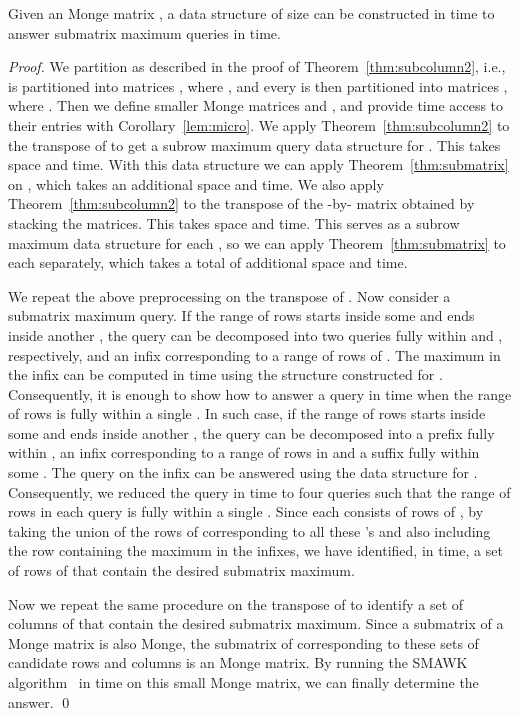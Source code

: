 \documentclass{llncs}
\begin{document}
\begin{theorem}
\label{thm:submatrix2}
Given an  Monge matrix , a data structure of size  can be constructed
in  time to answer submatrix maximum queries in  time.
\end{theorem}

\begin{proof}
We partition  as described in the proof of Theorem~\ref{thm:subcolumn2}, i.e.,  is
partitioned into  matrices , where , and every 
is then partitioned into  matrices , where .
Then we define smaller Monge matrices  and , and provide  time access to their
entries with Corollary~\ref{lem:micro}. We apply
Theorem~\ref{thm:subcolumn2} to the transpose of  to get a subrow
maximum query data structure for . This takes  space and
 time. With this data structure we can apply Theorem~\ref{thm:submatrix} on
, which takes an additional  space and  time. 
We also apply Theorem~\ref{thm:subcolumn2} to the transpose of the
-by-
matrix obtained by stacking the   matrices. 
This takes  space and
 time. This serves as a subrow maximum data structure for
each , so we can apply Theorem~\ref{thm:submatrix} to each
 separately, which takes a total of   additional space and  time. 




We repeat the above preprocessing on the transpose of .
Now consider a submatrix maximum query. If the range of rows starts inside some  and 
ends inside another , the query can be decomposed into two queries fully within  and
, respectively, and an infix corresponding to a range of rows of . The maximum
in the infix can be computed in  time using the structure constructed
for . Consequently, it is enough to show how to answer a query in 
time when the range of rows is fully within a single . In such case, if the range of rows
starts inside some  and ends inside another , the query can be decomposed
into a prefix fully within , an infix corresponding to a range of rows in 
and a suffix fully within some . 
The query on the infix can be answered using the data structure for . 
Consequently, we reduced the  query  in  time to four
queries such that the range of rows in each query is fully
within a single .
Since each  consists of  rows of ,
by taking the union of the rows of  corresponding to all
these 's and also including the row containing the maximum in the infixes,
we have identified, in  time, a set of  rows of
 that contain the desired submatrix maximum. 

Now we repeat the same procedure on the transpose of  to identify a set of
 columns of  that contain the desired submatrix
maximum.
Since a submatrix of a Monge matrix is also Monge, the submatrix of
 corresponding to these sets of candidate rows and columns is an
 Monge matrix. 
By running the SMAWK algorithm~\cite{SMAWK} in  time on
this small
Monge matrix, we can finally determine the answer.
\qed \end{proof}
\end{document}
